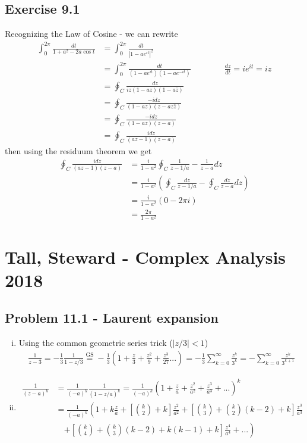 \documentclass[../main.tex]{subfiles}
\begin{document}
\subsection{Exercise 9.1}
Recognizing the Law of Cosine - we can rewrite
\begin{align}
\int_0^{2\pi}\frac{dt}{1+a^2-2a\cos t}
&=\int_0^{2\pi}\frac{dt}{|1-ae^{it}|^2}\\
&=\int_0^{2\pi}\frac{dt}{(1-ae^{it})(1-ae^{-it})}\qquad\qquad\frac{dz}{dt}=ie^{it}=iz\\
&=\oint_C\frac{dz}{iz(1-az)(1-a\bar{z})}\\
&=\oint_C\frac{-idz}{(1-az)(z-az\bar{z})}\\
&=\oint_C\frac{-idz}{(1-az)(z-a)}\\
&=\oint_C\frac{idz}{(az-1)(z-a)}
\end{align}
then using the residuum theorem we get
\begin{align}
\oint_C\frac{idz}{(az-1)(z-a)}
&=\frac{i}{1-a^2}\oint_C\frac{1}{z-1/a}-\frac{1}{z-a}dz\\
&=\frac{i}{1-a^2}\left(\oint_C\frac{dz}{z-1/a}-\oint_C\frac{dz}{z-a}dz\right)\\
&=\frac{i}{1-a^2}\left(0-2\pi i\right)\\
&=\frac{2\pi}{1-a^2}
\end{align}




\section{{\sc Tall, Steward} - Complex Analysis 2018}
\subsection{Problem 11.1 - Laurent expansion}
\begin{enumerate}[(i)]
\item Using the common geometric series trick ($|z/3|<1$)
\begin{align}
\frac{1}{z-3}=-\frac{1}{3}\frac{1}{1-z/3}
\overset{\text{GS}}{=}-\frac{1}{3}\left(1+\frac{z}{3}+\frac{z^2}{9}+\frac{z^3}{27}...\right)
=-\frac{1}{3}\sum_{k=0}^\infty\frac{z^k}{3^k}
=-\sum_{k=0}^\infty\frac{z^k}{3^{k+1}}
\end{align}

\item
\begin{align}
\frac{1}{(z-a)^k}
&=\frac{1}{(-a)^k}\frac{1}{(1-z/a)^k}
=\frac{1}{(-a)^k}\left(1+\frac{z}{a}+\frac{z^2}{a^2}+\frac{z^3}{a^3}+...\right)^k\\
&=\frac{1}{(-a)^k}\left(
1+k\frac{z}{a}
+\left[\binom{k}{2}+k\right]\frac{z^2}{a^2}
+\left[\binom{k}{3}+\binom{k}{2}(k-2)+k\right]\frac{z^3}{a^3}\right.\\
&\quad\left.
+\left[\binom{k}{4}+\binom{k}{3}(k-2)+k(k-1)+k\right]\frac{z^4}{a^4}
+...\right)
\end{align}
\end{enumerate}
\end{document}
